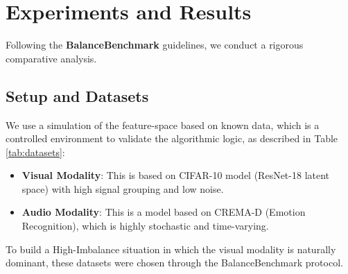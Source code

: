 \documentclass{ieeeaccess}
\begin{document}
\section{Experiments and Results}

Following the \textbf{BalanceBenchmark} guidelines, we conduct a rigorous comparative analysis.

\subsection{Setup and Datasets}
We use a simulation of the feature-space based on known data, which is a controlled environment to validate the algorithmic logic, as described in Table \ref{tab:datasets}:
\begin{itemize}
    \item \textbf{Visual Modality}: This is based on CIFAR-10 \cite{krizhevsky2009learning} model (ResNet-18 latent space) with high signal grouping and low noise.
    \item \textbf{Audio Modality}: This is a model based on CREMA-D \cite{cao2014crema} (Emotion Recognition), which is highly stochastic and time-varying.
\end{itemize}
To build a High-Imbalance situation in which the visual modality is naturally dominant, these datasets were chosen through the BalanceBenchmark \cite{xu2025balancebenchmark} protocol.

\begin{table}[h]
\caption{\textbf{Benchmark Dataset Specifications.} We align the feature simulation with the statistical moments of these standard datasets to ensure realistic imbalance dynamics.}
\label{tab:datasets}
\centering
{}

\end{table}
\end{document}

